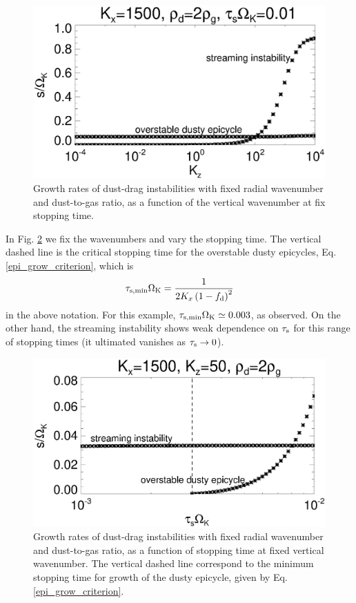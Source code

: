 \begin{figure}
  \includegraphics[width=\linewidth]{figures/streaming2}
  \caption{Growth rates of dust-drag instabilities with fixed radial
    wavenumber and dust-to-gas ratio, as a function of
    the vertical wavenumber at fix stopping time. \label{dusty_growth1}
  }
\end{figure}

In Fig. \ref{dusty_growth2} we fix the wavenumbers and vary the
stopping time. The vertical dashed line is the critical stopping time
for the overstable dusty epicycles, Eq. \ref{epi_grow_criterion},
which is  
\begin{align*}
  \tau_{\mathrm{s,min}}\Omega_{\rm K} = \frac{1}{2K_x\left(1-f_\mathrm{d}\right)^2} 
\end{align*}
in the above notation. For this example, $\tau_{\mathrm{s,min}}\Omega_{\rm K}\simeq 
0.003$, as observed. On the other hand, the streaming instability
shows weak dependence on $\tau_\mathrm{s}$ for this range of stopping times 
(it ultimated vanishes as $\tau_\mathrm{s}\to0$). 

\begin{figure}
  \includegraphics[width=\linewidth]{figures/streaming3}
  \caption{Growth rates of dust-drag instabilities with fixed radial
    wavenumber and dust-to-gas ratio, as a
    function of stopping time at fixed vertical wavenumber. The
    vertical dashed line correspond to the minimum stopping time for
    growth of the dusty epicycle, given by
    Eq. \protect\ref{epi_grow_criterion}. \label{dusty_growth2}
  }
\end{figure}

